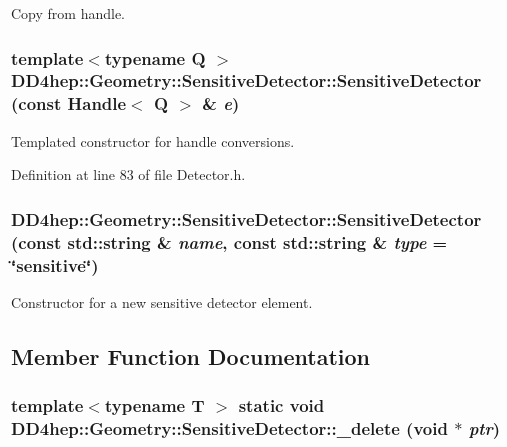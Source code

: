 Copy from handle. \hypertarget{class_d_d4hep_1_1_geometry_1_1_sensitive_detector_aea96c495ac02e7ce21cf05496be02309}{
\subsubsection[{SensitiveDetector}]{\setlength{\rightskip}{0pt plus 5cm}template$<$typename Q $>$ DD4hep::Geometry::SensitiveDetector::SensitiveDetector (const {\bf Handle}$<$ Q $>$ \& {\em e})}}
\label{class_d_d4hep_1_1_geometry_1_1_sensitive_detector_aea96c495ac02e7ce21cf05496be02309}


Templated constructor for handle conversions. 

Definition at line 83 of file Detector.h.\hypertarget{class_d_d4hep_1_1_geometry_1_1_sensitive_detector_a722d9ddcf488d7fc1c0fbe5772437cb1}{
\subsubsection[{SensitiveDetector}]{\setlength{\rightskip}{0pt plus 5cm}DD4hep::Geometry::SensitiveDetector::SensitiveDetector (const std::string \& {\em name}, \/  const std::string \& {\em type} = {\ttfamily \char`\"{}sensitive\char`\"{}})}}
\label{class_d_d4hep_1_1_geometry_1_1_sensitive_detector_a722d9ddcf488d7fc1c0fbe5772437cb1}


Constructor for a new sensitive detector element. 

\subsection{Member Function Documentation}
\hypertarget{class_d_d4hep_1_1_geometry_1_1_sensitive_detector_a126acbacbe8c3e1c0214585ec498e042}{
\subsubsection[{\_\-delete}]{\setlength{\rightskip}{0pt plus 5cm}template$<$typename T $>$ static void DD4hep::Geometry::SensitiveDetector::\_\-delete (void $\ast$ {\em ptr})}}
\label{class_d_d4hep_1_1_geometry_1_1_sensitive_detector_a126acbacbe8c3e1c0214585ec498e042}


